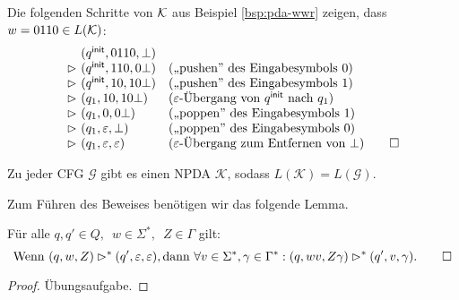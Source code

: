 \begin{Bsp*}
  Die folgenden Schritte von $\mathcal{K}$ aus Beispiel \ref{bsp:pda-wwr} zeigen, dass $w = 0110 \in L(\mathcal{K})$:
  \begin{displaymath}
  \begin{array}{r@{\ }ll}
    & (\qinit, 0110, \bot) \\
    \ConfRel & (\qinit, 110, 0\bot)  &\text{(,,pushen'' des Eingabesymbols $0$)}\\
    \ConfRel & (\qinit, 10, 10\bot)  &\text{(,,pushen'' des Eingabesymbols $1$)}\\
    \ConfRel & (q_1, 10, 10\bot)  &\text{($\Eps$-Übergang von $\qinit$ nach $q_1$)} \\
    \ConfRel & (q_1, 0, 0\bot)  &\text{(,,poppen'' des Eingabesymbols $1$)}\\
    \ConfRel & (q_1,\Eps, \bot) &\text{(,,poppen'' des Eingabesymbols $0$)}\\
    \ConfRel & (q_1, \Eps, \Eps) &\text{($\Eps$-Übergang zum Entfernen von $\bot$)}
    \qedhere
  \end{array}
\end{displaymath}
\end{Bsp*}

\begin{lemma}\label{lem:4.cfgToNpda}
 Zu jeder \ac{CFG} $\mathcal{G}$ gibt es einen \ac{NPDA} $\mathcal{K}$, sodass $L(\mathcal{K})=L(\mathcal{G})$.
\end{lemma}

  Zum Führen des Beweises benötigen wir das folgende Lemma.

\begin{lemma}\label{lem:4.mehrKeller}
Für alle $q,q' \in Q,\enspace w \in \Sigma^*,\enspace Z \in \Gamma$ gilt:
  \begin{displaymath}
    \text{Wenn } (q,w,Z) \rhd^* (q', \varepsilon, \varepsilon), \text{dann } \forall v \in \Sigma^*, \gamma \in \Gamma^*: (q, wv, Z\gamma) \rhd^* (q', v, \gamma).
    \qedhere
  \end{displaymath}
\end{lemma}
\begin{proof}
Übungsaufgabe.
\end{proof}


